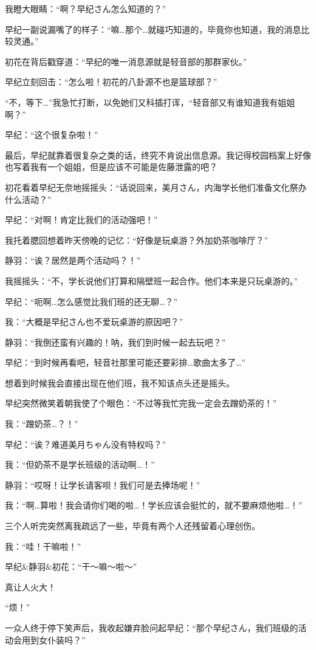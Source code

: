 我瞪大眼睛：“啊？早纪さん怎么知道的？”

早纪一副说漏嘴了的样子：“嘛…那个…就碰巧知道的，毕竟你也知道，我的消息比较灵通。”

初花在背后戳穿道：“早纪的唯一消息源就是轻音部的那群家伙。”

早纪立刻回击：“怎么啦！初花的八卦源不也是篮球部？”

“不，等下…”我急忙打断，以免她们又科插打诨，“轻音部又有谁知道我有姐姐啊？”

早纪：“这个很复杂啦！”

最后，早纪就靠着很复杂之类的话，终究不肯说出信息源。我记得校园档案上好像也写着我有一个姐姐，但是应该不可能是佐藤泄露的吧？

初花看着早纪无奈地摇摇头：“话说回来，美月さん，内海学长他们准备文化祭办什么活动？”

早纪：“对啊！肯定比我们的活动强吧！”

我托着腮回想着昨天傍晚的记忆：“好像是玩桌游？外加奶茶咖啡厅？”

静羽：“诶？居然是两个活动吗？！”

我摇摇头：“不，学长说他们打算和隔壁班一起合作。他们本来是只玩桌游的。”

早纪：“呃啊…怎么感觉比我们班的还无聊…？”

我：“大概是早纪さん也不爱玩桌游的原因吧？”

静羽：“我倒还蛮有兴趣的！呐，我们到时候一起去玩吧？”

早纪：“到时候再看吧，轻音社那里可能还要彩排…歌曲太多了…”

想着到时候我会直接出现在他们班，我不知该点头还是摇头。

早纪突然微笑着朝我使了个眼色：“不过等我忙完我一定会去蹭奶茶的！”

我：“蹭奶茶…？！”

早纪：“诶？难道美月ちゃん没有特权吗？”

我：“但奶茶不是学长班级的活动啊…！”

静羽：“哎呀！让学长请客呗！我们可是去捧场呢！”

我：“啊…算啦！我会请你们喝的啦…！学长应该会挺忙的，就不要麻烦他啦…！”

三个人听完突然离我疏远了一些，毕竟有两个人还残留着心理创伤。

我：“哇！干嘛啦！”

早纪$\&$静羽$\&$初花：“干～嘛～啦～”

真让人火大！

“烦！”

一众人终于停下笑声后，我收起嫌弃脸问起早纪：“那个早纪さん，我们班级的活动会用到女仆装吗？”

